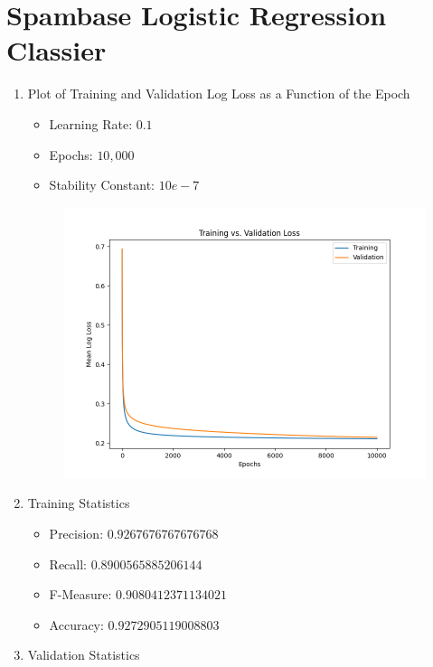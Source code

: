 \documentclass[12pt]{article}
\begin{document}
\section{Spambase Logistic Regression Classier}\label{naive}

\begin{enumerate}
   \item Plot of Training and Validation Log Loss as a Function of the Epoch
   \begin{itemize}
     \item Learning Rate: $0.1$
     \item Epochs: $10,000$
     \item Stability Constant: $10e-7$
   \end{itemize}
    \begin{figure}[H]
        \begin{center}
        \includegraphics{images/training_validation_mean_log_loss.png}
        \label{GD}
        \end{center}
    \end{figure}
   \item Training Statistics
   \begin{itemize}
     \item Precision: $0.9267676767676768$
     \item Recall: $0.8900565885206144$
     \item F-Measure: $0.9080412371134021$
     \item Accuracy: $0.9272905119008803$
   \end{itemize}
   \item Validation Statistics

\end{enumerate}
\end{document}
